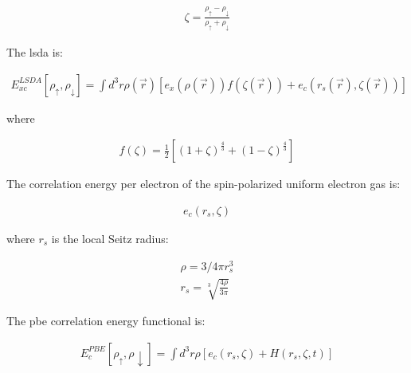 \begin{equation}
\begin{split}
\zeta = \frac{\rho_{\uparrow} - \rho_{\downarrow}}{\rho_{\uparrow} + \rho_{\downarrow}}
\end{split}
\label{eq:functional5}
\end{equation}

The \acrshort{lsda} is:

\begin{equation}
\begin{split}
E_{xc}^{LSDA} [\rho_{\uparrow}, \rho_{\downarrow}] = \int d^3r \rho(\vec{r}) \left[e_x(\rho(\vec{r})) f(\zeta(\vec{r})) + e_c(r_s(\vec{r}), \zeta(\vec{r})) \right ]
\end{split}
\label{eq:functional6}
\end{equation}

where

\begin{equation}
\begin{split}
f(\zeta) = \frac{1}{2} \left[(1 + \zeta)^{\frac{4}{3}} + (1 - \zeta)^{\frac{4}{3}} \right]
\end{split}
\label{eq:functional7}
\end{equation}

The correlation energy per electron of the spin-polarized uniform electron gas is:

\begin{equation}
\begin{split}
e_c (r_s, \zeta)
\end{split}
\label{eq:functional8}
\end{equation}

where $r_s$ is the local Seitz radius:

\begin{equation}
\begin{split}
\rho = 3/4 \pi r_s^3 \\
r_s = \sqrt[3]{\frac{4 \rho}{3 \pi}}
\end{split}
\label{eq:functional9}
\end{equation}

The \acrshort{pbe} correlation energy functional is:

\begin{equation}
\begin{split}
E_{c}^{PBE} [\rho_{\uparrow}, \rho{\downarrow}] = \int d^3r \rho[e_c (r_s, \zeta) + H(r_s, \zeta, t)] 
\end{split}
\label{eq:functional9}
\end{equation}

